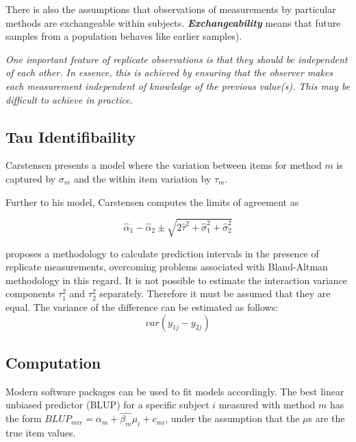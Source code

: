 \documentclass[12pt, a4paper]{report}
\theoremstyle{plain}
\theoremstyle{definition}
\theoremstyle{remark}
\begin{document}
	There is also the
	assumptions that observations of measurements by particular
	methods are exchangeable within subjects.  \textbf{\textit{Exchangeability}} means
	that future samples from a population behaves like earlier
	samples).
	
	
	
	\emph{
		One important feature of replicate observations is that they should be independent
		of each other. In essence, this is achieved by ensuring that the observer makes each
		measurement independent of knowledge of the previous value(s). This may be difficult
		to achieve in practice.}
	
	
	\subsection{Tau Identifibaility}
	
	Carstensen presents a model where the variation between items for
	method $m$ is captured by $\sigma_m$ and the within item variation
	by $\tau_m$.
	
	Further to his model, Carstensen computes the limits of agreement
	as
	
	\[
	\hat{\alpha}_1 - \hat{\alpha}_2 \pm \sqrt{2 \hat{\tau}^2 +
		\hat{\sigma}^2_1 + \hat{\sigma}^2_2}
	\]
	
	
	\citet{BXC2008} proposes a methodology to calculate prediction
	intervals in the presence of replicate measurements, overcoming problems associated with Bland-Altman methodology in this regard.
	It is not possible to estimate the interaction variance components
	$\tau^{2}_{1}$ and $\tau^{2}_{2}$ separately. Therefore it must be
	assumed that they are equal. The variance of the difference can be
	estimated as follows:
	\begin{equation}
	var(y_{1j}-y_{2j})
	\end{equation}
	
	
	\subsection{Computation} Modern software
	packages can be used to fit models accordingly. The best linear
	unbiased predictor (BLUP) for a specific subject $i$ measured with
	method $m$ has the form $BLUP_{mir} = \hat{\alpha_{m}} +
	\hat{\beta_{m}}\mu_{i} + c_{mi}$, under the assumption that the
	$\mu$s are the true item values.
	
\end{document}
